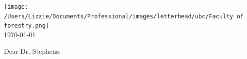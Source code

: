 \documentclass[11pt]{article}
\begin{document}

\renewcommand{\refname}{\CHead{}}

\hspace{-5ex} \texttt{[image: /Users/Lizzie/Documents/Professional/images/letterhead/ubc/Faculty of forestry.png]}
\vspace{1.5ex}\\

\setlength{\parindent}{0pt}
\setlength{\parskip}{7pt}
\today


Dear Dr. Stephens:
\end{document}
